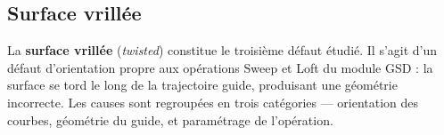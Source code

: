 \subsection{Surface vrillée}
\label{subsec:arbre-surface-vrillee}

La \textbf{surface vrillée} (\textit{twisted}) constitue le troisième défaut étudié. Il s'agit d'un défaut d'orientation propre aux opérations Sweep et Loft du module GSD : la surface se tord le long de la trajectoire guide, produisant une géométrie incorrecte. Les causes sont regroupées en trois catégories — orientation des courbes, géométrie du guide, et paramétrage de l'opération.



